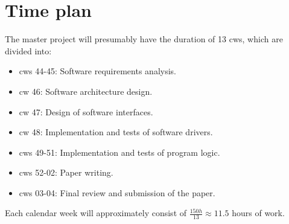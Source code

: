 %
%

\chapter{Time plan}
\label{chap:Time plan}
%
The master project will presumably have the duration of 13 \acp{cw}, which are divided into:

\begin{itemize}
    \item \acsp{cw} 44-45: Software requirements analysis.
    \item \acs{cw} 46: Software architecture design.
    \item \acs{cw} 47: Design of software interfaces.
    \item \acs{cw} 48: Implementation and tests of software drivers.
    \item \acsp{cw} 49-51: Implementation and tests of program logic.
    \item \acsp{cw} 52-02: Paper writing.
    \item \acsp{cw} 03-04: Final review and submission of the paper.
\end{itemize}

Each calendar week will approximately consist of $\frac{150\unit{h}}{13} \approx 11.5$ hours of work.